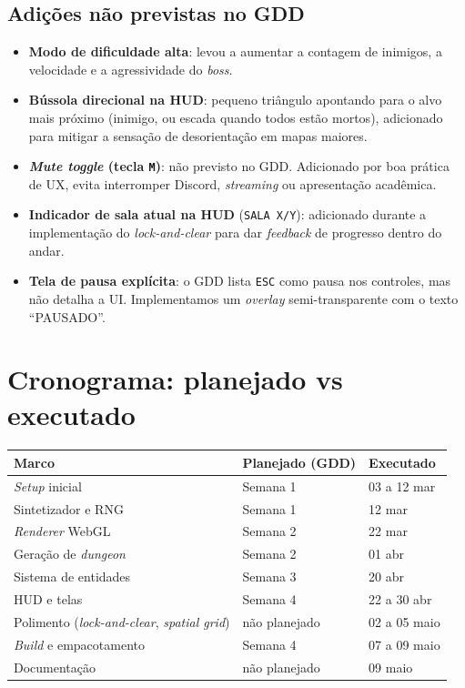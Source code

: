 \subsection{Adições não previstas no GDD}

\begin{itemize}
  \item \textbf{Modo de dificuldade alta}: levou a aumentar a contagem de
    inimigos, a velocidade e a agressividade do \emph{boss}.
  \item \textbf{Bússola direcional na HUD}: pequeno triângulo apontando para o
    alvo mais próximo (inimigo, ou escada quando todos estão mortos),
    adicionado para mitigar a sensação de desorientação em mapas maiores.
  \item \textbf{\emph{Mute toggle} (tecla \texttt{M})}: não previsto no GDD.
    Adicionado por boa prática de UX, evita interromper Discord, \emph{streaming}
    ou apresentação acadêmica.
  \item \textbf{Indicador de sala atual na HUD} (\texttt{SALA X/Y}): adicionado
    durante a implementação do \emph{lock-and-clear} para dar \emph{feedback} de
    progresso dentro do andar.
  \item \textbf{Tela de pausa explícita}: o GDD lista \texttt{ESC} como pausa nos
    controles, mas não detalha a UI. Implementamos um \emph{overlay}
    semi-transparente com o texto ``PAUSADO''.
\end{itemize}

\section{Cronograma: planejado vs executado}

\begin{tabular}{lll}
  \toprule
  \textbf{Marco} & \textbf{Planejado (GDD)} & \textbf{Executado} \\
  \midrule
  \emph{Setup} inicial & Semana 1 & 03 a 12 mar \\
  Sintetizador e RNG & Semana 1 & 12 mar \\
  \emph{Renderer} WebGL & Semana 2 & 22 mar \\
  Geração de \emph{dungeon} & Semana 2 & 01 abr \\
  Sistema de entidades & Semana 3 & 20 abr \\
  HUD e telas & Semana 4 & 22 a 30 abr \\
  Polimento (\emph{lock-and-clear}, \emph{spatial grid}) & não planejado & 02 a 05 maio \\
  \emph{Build} e empacotamento & Semana 4 & 07 a 09 maio \\
  Documentação & não planejado & 09 maio \\
  \bottomrule
\end{tabular}

